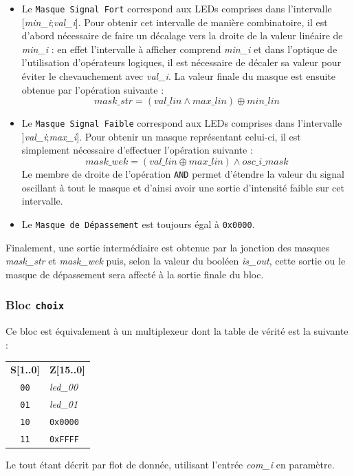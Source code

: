 \begin{itemize}

\item Le \texttt{Masque Signal Fort} correspond aux LEDs comprises dans l'intervalle [\textit{min\_i};\textit{val\_i}]. Pour obtenir cet intervalle de manière combinatoire, il est d'abord nécessaire de faire un décalage vers la droite de la valeur linéaire de \textit{min\_i} : en effet l'intervalle à afficher comprend \textit{min\_i} et dans l'optique de l'utilisation d'opérateurs logiques, il est nécessaire de décaler sa valeur pour éviter le chevauchement avec \textit{val\_i}. La valeur finale du masque est ensuite obtenue par l'opération suivante :
\begin{equation*}
 mask\_str = (val\_lin \land max\_lin) \oplus min\_lin
\end{equation*}

\item Le \texttt{Masque Signal Faible} correspond aux LEDs comprises dans l'intervalle ]\textit{val\_i};\textit{max\_i}]. Pour obtenir un masque représentant celui-ci, il est simplement nécessaire d'effectuer l'opération suivante :
\begin{equation*}
mask\_wek = (val\_lin \oplus max\_lin ) \land osc\_i\_mask
\end{equation*}
Le membre de droite de l'opération \texttt{AND} permet d'étendre la valeur du signal oscillant à tout le masque et d'ainsi avoir une sortie d'intensité faible sur cet intervalle.

\item Le \texttt{Masque de Dépassement} est toujours égal à \texttt{0x0000}.

\end{itemize}

Finalement, une sortie intermédiaire est obtenue par la jonction des masques \textit{mask\_str} et \textit{mask\_wek} puis, selon la valeur du booléen \textit{is\_out}, cette sortie ou le masque de dépassement sera affecté à la sortie finale du bloc.

\subsubsection{Bloc \texttt{choix}}

Ce bloc est équivalement à un multiplexeur dont la table de vérité est la suivante : 

\begin{center}

\begin{tabular}{c|l}
\textbf{S[1..0]} & \textbf{Z[15..0]} \\
\texttt{00} & \textit{led\_00} \\
\texttt{01} & \textit{led\_01} \\
\texttt{10} & \texttt{0x0000} \\
\texttt{11} & \texttt{0xFFFF} 
\end{tabular}

\end{center}
Le tout étant décrit par flot de donnée, utilisant l'entrée \textit{com\_i} en paramètre.
